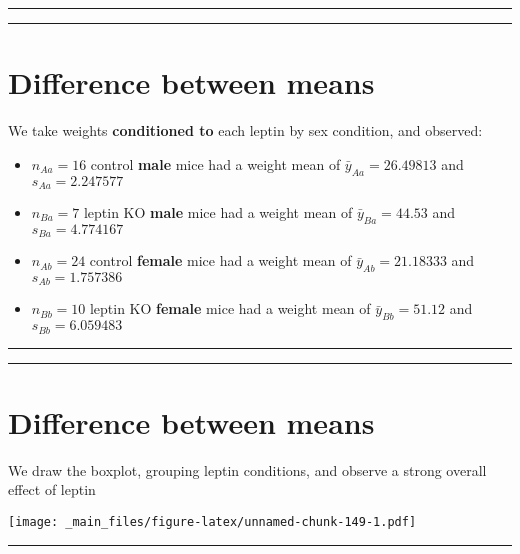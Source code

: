 \documentclass[
]{book}
\begin{document}
\begin{center}\rule{0.5\linewidth}{0.5pt}\end{center}

\begin{center}\rule{0.5\linewidth}{0.5pt}\end{center}

\hypertarget{difference-between-means-10}{%
\section{Difference between means}\label{difference-between-means-10}}

We take weights \textbf{conditioned to} each leptin by sex condition, and observed:

\begin{itemize}
\item
  \(n_{Aa}=16\) control \textbf{male} mice had a weight mean of \(\bar{y}_{Aa}=26.49813\) and \(s_{Aa}=2.247577\)
\item
  \(n_{Ba}=7\) leptin KO \textbf{male} mice had a weight mean of \(\bar{y}_{Ba}=44.53\) and \(s_{Ba}=4.774167\)
\item
  \(n_{Ab}=24\) control \textbf{female} mice had a weight mean of \(\bar{y}_{Ab}=21.18333\) and \(s_{Ab}=1.757386\)
\item
  \(n_{Bb}=10\) leptin KO \textbf{female} mice had a weight mean of \(\bar{y}_{Bb}=51.12\) and \(s_{Bb}=6.059483\)
\end{itemize}

\begin{center}\rule{0.5\linewidth}{0.5pt}\end{center}

\begin{center}\rule{0.5\linewidth}{0.5pt}\end{center}

\hypertarget{difference-between-means-11}{%
\section{Difference between means}\label{difference-between-means-11}}

We draw the boxplot, grouping leptin conditions, and observe a strong overall effect of leptin

\texttt{[image: \_main\_files/figure-latex/unnamed-chunk-149-1.pdf]}

\begin{center}\rule{0.5\linewidth}{0.5pt}\end{center}
\end{document}
